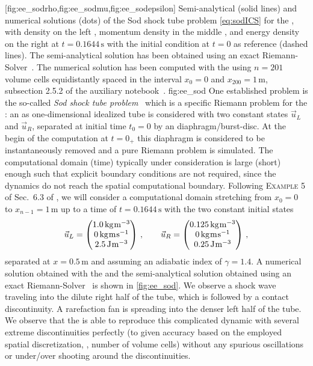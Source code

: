 	[fig:ee_sodrho,fig:ee_sodmu,fig:ee_sodepsilon]%
	{%
	Semi-analytical (solid lines) and numerical solutions (dots) of the Sod shock tube problem \eqref{eq:sodICS} for the \eulereqs{}, with density on the left , momentum density in the middle , and energy density on the right  at $t=0.1644\,\mathrm{s}$ with the initial condition at $t=0$ as reference (dashed lines).
	The semi-analytical solution has been obtained using an exact Riemann-Solver~\cite{Toro2009,ToroExact:GitHub}.
	The numerical solution has been computed with the \ktScheme{} using $n=201$ volume cells equidistantly spaced in the interval $x_0=0$ and $x_{200}=1\,\mathrm{m}$, \cf{} subsection 2.5.2 of the auxiliary notebook~\cite{Steil:2023PhDFVNB}.
	}%
	{fig:ee_sod}%
One established problem is the so-called \textit{Sod shock tube problem}~\cite{Sod1978Apr} which is a specific Riemann problem for the \eulereqs{}: an as one-dimensional idealized tube is considered with two constant states $\vec{u}_L$ and $\vec{u}_R$, separated at initial time $t_0=0$ by an diaphragm/burst-disc.
At the begin of the computation at $t=0_+$ this diaphragm is considered to be instantaneously removed and a pure Riemann problem is simulated. 
The computational domain (time) typically under consideration is large (short) enough such that explicit boundary conditions are not required, since the dynamics do not reach the spatial computational boundary. 
Following \textsc{Example} 5 of Sec.~6.3 of , we will consider a computational domain stretching from $x_0=0$ to $x_{n-1}=1\,\mathrm{m}$ up to a time of $t=0.1644\,\mathrm{s}$ with the two constant initial states
\begin{align}
\vec{u}_L=\begin{pmatrix}
	1.0\,\mathrm{kg}\mkern1.0mu\mathrm{m}^{-3}\\
	0\,\mathrm{kg}\mkern1.0mu\mathrm{m}\mkern1.0mu\mathrm{s}^{-1}\\
	2.5\,\mathrm{J}\mkern1.0mu\mathrm{m}^{-3}
\end{pmatrix}\,,\qquad \vec{u}_R=\begin{pmatrix}
	0.125\,\mathrm{kg}\mkern1.0mu\mathrm{m}^{-3}\\
	0\,\mathrm{kg}\mkern1.0mu\mathrm{m}\mkern1.0mu\mathrm{s}^{-1}\\
	0.25\,\mathrm{J}\mkern1.0mu\mathrm{m}^{-3}
\end{pmatrix}\, ,
\label{eq:sodICS}
\end{align}
separated at $x=0.5\,\mathrm{m}$ and assuming an adiabatic index of $\gamma=1.4$.
A numerical solution obtained with the \ktScheme{} and the semi-analytical solution obtained using an exact Riemann-Solver~\cite{Toro2009,ToroExact:GitHub} is shown in \cref{fig:ee_sod}.
We observe a shock wave traveling into the dilute right half of the tube, which is followed by a contact discontinuity.
A rarefaction fan is spreading into the denser left half of the tube.
We observe that the \ktScheme{} is able to reproduce this complicated dynamic with several extreme discontinuities perfectly (to given accuracy based on the employed spatial discretization, \ie{}, number of volume cells) without any spurious oscillations or under/over shooting around the discontinuities.

